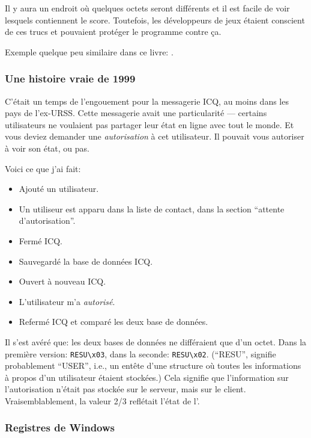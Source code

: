 Il y aura un endroit où quelques octets seront différents et il est facile de voir
lesquels contiennent le score.
Toutefois, les développeurs de jeux étaient conscient de ces trucs et pouvaient protéger
le programme contre ça.

Exemple quelque peu similaire dans ce livre: .


\subsubsection{Une histoire vraie de 1999}

C'était un temps de l'engouement pour la messagerie ICQ, au moins dans les pays de
l'ex-URSS.
Cette messagerie avait une particularité --- certains utilisateurs ne voulaient pas
partager leur état en ligne avec tout le monde.
Et vous deviez demander une \emph{autorisation} à cet utilisateur.
Il pouvait vous autoriser à voir son état, ou pas.

Voici ce que j'ai fait:

\begin{itemize}
\item Ajouté un utilisateur.
\item Un utiliseur est apparu dans la liste de contact, dans la section ``attente d'autorisation''.
\item Fermé ICQ.
\item Sauvegardé la base de données ICQ.
\item Ouvert à nouveau ICQ.
\item L'utilisateur m'a \emph{autorisé}.
\item Refermé ICQ et comparé les deux base de données.
\end{itemize}

Il s'est avéré que: les deux bases de données ne différaient que d'un octet.
Dans la première version: \verb|RESU\x03|, dans la seconde: \verb|RESU\x02|.
(``RESU'', signifie probablement ``USER'', i.e., un entête d'une structure où toutes
les informations à propos d'un utilisateur étaient stockées.)
Cela signifie que l'information sur l'autorisation n'était pas stockée sur le serveur,
mais sur le client. Vraisemblablement, la valeur 2/3 reflétait l'état de l'.

\subsubsection{Registres de Windows}

